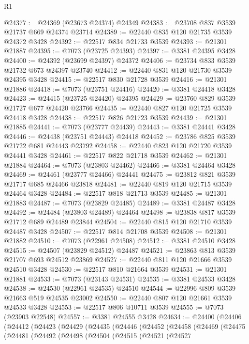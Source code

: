 \begin{lexlean}{R1}
\begin{coremodule}
@24377 := @24369 (@23673 @24374) @24349
@24383 := @23708 @837 @3539 @21737 @669 @24374 @23714
@24389 := @22440 @835 @120 @21735 @3539 @24372 @3428
@24392 := @22517 @834 @21733 @3539
@24393 := @21301 @21887
@24395 := @7073 (@23725 @24393)
@24397 := @3381 @24395 @3428
@24400 := @24392 (@23699 @24397) @24372
@24406 := @23734 @833 @3539 @21732 @673 @24397 @23740
@24412 := @22440 @831 @120 @21730 @3539 @24395 @3428
@24415 := @22517 @830 @21728 @3539
@24416 := @21301 @21886
@24418 := @7073 (@23751 @24416)
@24420 := @3381 @24418 @3428
@24423 := @24415 (@23725 @24420) @24395
@24429 := @23760 @829 @3539 @21727 @677 @24420 @23766
@24435 := @22440 @827 @120 @21725 @3539 @24418 @3428
@24438 := @22517 @826 @21723 @3539
@24439 := @21301 @21885
@24441 := @7073 (@23777 @24439)
@24443 := @3381 @24441 @3428
@24446 := @24438 (@23751 @24443) @24418
@24452 := @23786 @825 @3539 @21722 @681 @24443 @23792
@24458 := @22440 @823 @120 @21720 @3539 @24441 @3428
@24461 := @22517 @822 @21718 @3539
@24462 := @21301 @21884
@24464 := @7073 (@23803 @24462)
@24466 := @3381 @24464 @3428
@24469 := @24461 (@23777 @24466) @24441
@24475 := @23812 @821 @3539 @21717 @685 @24466 @23818
@24481 := @22440 @819 @120 @21715 @3539 @24464 @3428
@24484 := @22517 @818 @21713 @3539
@24485 := @21301 @21883
@24487 := @7073 (@23829 @24485)
@24489 := @3381 @24487 @3428
@24492 := @24484 (@23803 @24489) @24464
@24498 := @23838 @817 @3539 @21712 @689 @24489 @23844
@24504 := @22440 @815 @120 @21710 @3539 @24487 @3428
@24507 := @22517 @814 @21708 @3539
@24508 := @21301 @21882
@24510 := @7073 (@22961 @24508)
@24512 := @3381 @24510 @3428
@24515 := @24507 (@23829 @24512) @24487
@24521 := @23863 @813 @3539 @21707 @693 @24512 @23869
@24527 := @22440 @811 @120 @21666 @3539 @24510 @3428
@24530 := @22517 @810 @21664 @3539
@24531 := @21301 @21881
@24533 := @7073 (@23143 @24531)
@24535 := @3381 @24533 @3428
@24538 := @24530 (@22961 @24535) @24510
@24544 := @22996 @809 @3539 @21663 @519 @24535 @23002
@24550 := @22440 @807 @120 @21661 @3539 @24533 @3428
@24553 := @22517 @806 @10711 @3539
@24555 := @7073 (@23903 @22548)
@24557 := @3381 @24555 @3428
@24634 := @24400
    (@24406
      (@24412
        (@24423
          (@24429
            (@24435
              (@24446
                (@24452
                  (@24458
                    (@24469
                      (@24475
                        (@24481
                          (@24492
                            (@24498
                              (@24504
                                (@24515
                                  (@24521
                                    (@24527

\end{coremodule}
\end{lexlean}
